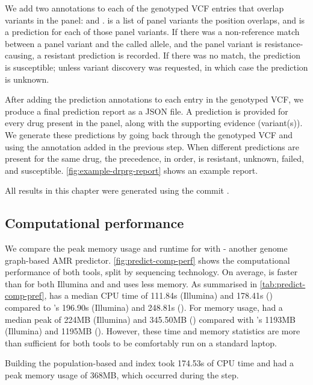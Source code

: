 We add two annotations to each of the genotyped VCF entries that overlap variants in the panel:  and .  is a list of panel variants the position overlaps, and  is a prediction for each of those panel variants. If there was a non-reference match between a panel variant and the called allele, and the panel variant is resistance-causing, a resistant prediction is recorded. If there was no match, the prediction is susceptible; unless variant discovery was requested, in which case the prediction is unknown. 

After adding the prediction annotations to each entry in the genotyped VCF, we produce a final prediction report as a JSON file. A prediction is provided for every drug present in the panel, along with the supporting evidence (variant(s)). We generate these predictions by going back through the genotyped VCF and using the  annotation added in the previous step. When different predictions are present for the same drug, the precedence, in order, is resistant, unknown, failed, and susceptible. \autoref{fig:example-drprg-report} shows an example report.

\noindent
All \drprg{} results in this chapter were generated using the commit \href{https://github.com/mbhall88/drprg/tree/cb4f9b82b5d03de45b8016ae5d54bbce7a8f3a0f}{}.

\subsection{Computational performance}
\label{sec:drprg-comp-perf}

We compare the peak memory usage and runtime for \drprg{}  with \mykrobe{} - another genome graph-based AMR predictor. \autoref{fig:predict-comp-perf} shows the computational performance of both tools, split by sequencing technology. On average, \drprg{} is faster than \mykrobe{} for both Illumina and \ont{} and uses less memory. As summarised in \autoref{tab:predict-comp-pref}, \drprg{} has a median CPU time of 111.84s (Illumina) and 178.41s (\ont{}) compared to \mykrobe{}'s 196.90s (Illumina) and 248.81s (\ont{}). For memory usage, \drprg{} had a median peak of 224MB (Illumina) and 345.50MB (\ont{}) compared with \mykrobe{}'s 1193MB (Illumina) and 1195MB (\ont{}). However, these time and memory statistics are more than sufficient for both tools to be comfortably run on a standard laptop. 

Building the \drprg{} population-based \prg{} and index took 174.53s of CPU time and had a peak memory usage of 368MB, which occurred during the \makeprg{} step.

